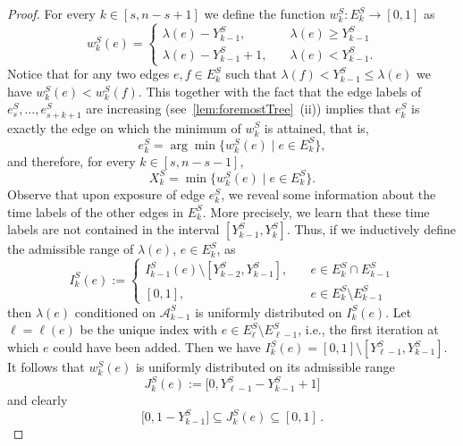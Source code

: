 \documentclass[a4paper,11pt]{article}
\theoremstyle{definition}
\theoremstyle{plain}
\newcommand{\A}{\mathcal A}
\newcommand{\w}{w}
\begin{document}
\begin{proof}
  For every $k\in [s, n - s + 1]$ we define the function $\w_k^{S}: E_k^{S} \rightarrow [0,1]$ as
  \[
  \w^S_k(e) =
  \begin{cases}
    \lambda(e) - Y_{k-1}^{S}, & \quad \lambda(e) \geq Y_{k-1}^{S}\\
    \lambda(e) - Y_{k-1}^{S} + 1, & \quad \lambda(e) < Y_{k-1}^{S}.
  \end{cases}
  \]
  Notice that for any two edges $e,f \in E_k^{S}$ such that $\lambda(f) < Y_{k-1}^{S} \leq \lambda(e)$
  we have $\w_k^{S}(e) < \w_k^{S}(f)$. This together with the fact that the edge labels of $e_s^S,\ldots, e_{s+k+1}^S$ are increasing (see~\cref{lem:foremostTree}~(ii)) implies that $e_k^{S}$ is exactly
  the edge on which the minimum of $w_k^{S}$ is attained, that is,
  \begin{equation}\label{eq:ek_is_argmin}
    e_k^{S}
    = \arg\min \{\w_k^{S}(e) \mid e \in E_k^{S} \},
  \end{equation}
  and therefore, for every $k \in [s, n-s - 1]$,
  \begin{equation}\label{eq:Xk}
    X_k^{S}
    = \min\{w_k^{S}(e) \mid e \in E_k^{S}\}.
  \end{equation}
  Observe that upon exposure of edge $e_k^{S}$, we reveal some information about the time labels of the other edges in $E_k^{S}$.
  More precisely, we learn that these time labels are not contained in the interval $[Y_{k-1}^{S}, Y_k^{S}]$.
  Thus, if we inductively define the admissible range of $\lambda(e)$, $e \in E_k^{S}$, as
  \[
      I_k^{S}(e) :=
      \begin{cases}
        I_{k-1}^{S}(e) \setminus [Y_{k-2}^{S}, Y_{k-1}^{S}], & \quad e \in E_k^{S} \cap E_{k-1}^{S}\\
        [0,1], & \quad e \in E_k^{S} \setminus E_{k-1}^{S}
  \end{cases}
  \]
  then $\lambda(e)$ conditioned on $\A_{k-1}^{S}$ is uniformly distributed on $I_k^{S}(e)$.
  Let $\ell = \ell(e)$ be the unique index with $e \in E_\ell^{S} \setminus E_{\ell-1}^{S}$, i.e., the first iteration at which $e$ could have been added.
  Then we have $I_k^{S}(e) = [0,1] \setminus [Y_{\ell-1}^{S} , Y_{k-1}^{S}]$.
  It follows that $w_k^{S}(e)$ is uniformly distributed on its admissible range
  \[
    J_k^{S}(e) := \mathopen[ 0, Y_{\ell-1}^{S} - Y_{k-1}^{S} + 1 \mathclose]
  \]
  and clearly
    \begin{equation}\label{eq:inclusion}
    \mathopen[ 0, 1 - Y_{k-1}^{S} \mathclose] \subseteq J_k^{S}(e) \subseteq [0, 1] \,.
  \end{equation}


\end{proof}
\end{document}
